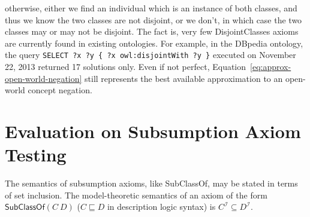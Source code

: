 \documentclass{llncs}
\begin{document}
otherwise, either we find an individual which is an instance of both classes,
and thus we know the two classes are not disjoint, or we don't,
in which case the two classes may or may not be disjoint.
The fact is, very few \textsf{DisjointClasses} axioms are currently found in existing
ontologies. For example, in the DBpedia ontology, the query
\texttt{SELECT ?x ?y \{ ?x owl:disjointWith ?y \}} executed on November 22, 2013
returned 17 solutions only.
Even if not perfect, Equation~\ref{eq:approx-open-world-negation} still
represents the best available approximation to an open-world concept negation.


\section{Evaluation on Subsumption Axiom Testing}
\label{evaluation}


The semantics of subsumption axioms, like \textsf{SubClassOf}, may be stated in terms of set inclusion.
The model-theoretic semantics of an axiom of the form $\mathsf{SubClassOf}(C\ D)$
($C \sqsubseteq D$ in description logic syntax) is $C^\mathcal{I} \subseteq D^\mathcal{I}$.
\end{document}
